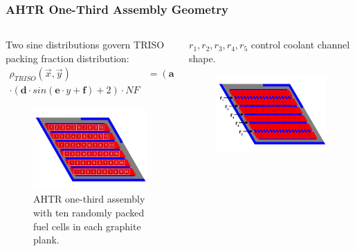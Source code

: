 \begin{frame}
    \frametitle{AHTR One-Third Assembly Geometry}
    \begin{columns}
        \begin{column}{0.5\textwidth}
            Two sine distributions govern TRISO packing fraction distribution: 
            \begin{align}
            \rho_{TRISO}(\vec{x}, \vec{y}) &= \left(\textbf{a}\cdot sin(\textbf{b}\cdot x + \textbf{c}) + 2\right) \\
            \cdot \left(\textbf{d}\cdot sin(\textbf{e}\cdot y + \textbf{f}) + 2\right) \cdot NF \nonumber
            \end{align}
            \begin{figure}
                \includegraphics[width=\linewidth]{../docs/figures/ahtr_assembly.png} 
                \caption{AHTR one-third assembly with ten randomly packed fuel cells in 
                each graphite plank.}
            \end{figure}
        \end{column}
        \begin{column}{0.5\textwidth} 
            $r_1, r_2, r_3, r_4, r_5$ control coolant channel shape.
            \begin{figure}
                \includegraphics[width=\linewidth]{../docs/figures/coolant-channel-shape-assem.png} 

\end{figure}
\end{column}
\end{columns}
\end{frame}

